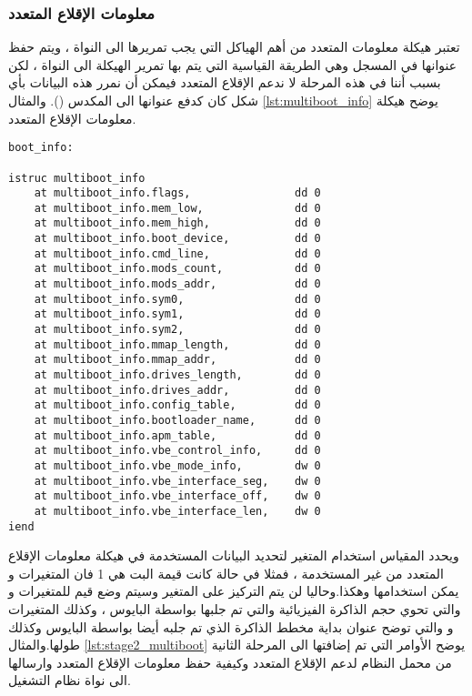 \documentclass[document.tex]{subfiles}
\begin{document}
\subsubsection{معلومات الإقلاع المتعدد} 
تعتبر هيكلة معلومات المتعدد من أهم الهياكل التي يجب تمريرها الى النواة ، ويتم حفظ عنوانها في المسجل  وهي الطريقة القياسية التي يتم بها تمرير الهيكلة الى النواة ، لكن بسبب أننا في هذه المرحلة لا ندعم الإقلاع المتعدد فيمكن أن نمرر هذه البيانات بأي شكل كان كدفع عنوانها الى المكدس (). والمثال \ref{lst:multiboot_info} يوضح هيكلة معلومات الإقلاع المتعدد.
\begin{english}
\lstset{numberstyle=\tiny,numbers=left,stepnumber=1,numbersep=5pt,tabsize=2,extendedchars=true,breaklines=true,frame=b,showspaces=false, showtabs=false,xleftmargin=10pt,framexleftmargin=10pt,framexrightmargin=5pt,framexbottommargin=4pt,showstringspaces=false,language=[x86masm]Assembler}

\begin{lstlisting}[label=lst:multiboot_info,caption=\en{Multiboot Inforamtion Structure}]
boot_info:

istruc multiboot_info
	at multiboot_info.flags,				dd 0
	at multiboot_info.mem_low,				dd 0
	at multiboot_info.mem_high,				dd 0
	at multiboot_info.boot_device,			dd 0
	at multiboot_info.cmd_line,				dd 0
	at multiboot_info.mods_count,			dd 0
	at multiboot_info.mods_addr,			dd 0
	at multiboot_info.sym0,					dd 0
	at multiboot_info.sym1,					dd 0
	at multiboot_info.sym2,					dd 0
	at multiboot_info.mmap_length,			dd 0
	at multiboot_info.mmap_addr,			dd 0
	at multiboot_info.drives_length,		dd 0
	at multiboot_info.drives_addr,			dd 0
	at multiboot_info.config_table,			dd 0
	at multiboot_info.bootloader_name,		dd 0
	at multiboot_info.apm_table,			dd 0
	at multiboot_info.vbe_control_info,		dd 0
	at multiboot_info.vbe_mode_info,		dw 0
	at multiboot_info.vbe_interface_seg,	dw 0
	at multiboot_info.vbe_interface_off,	dw 0
	at multiboot_info.vbe_interface_len,	dw 0
iend
\end{lstlisting}
\end{english}

ويحدد المقياس استخدام المتغير  لتحديد البيانات المستخدمة في هيكلة معلومات الإقلاع المتعدد من غير المستخدمة ، فمثلا في حالة كانت قيمة البت  هي 1 فان المتغيرات  و  يمكن استخدامها وهكذا.وحاليا لن يتم التركيز على المتغير   وسيتم وضع قيم للمتغيرات  و  والتي تحوي حجم الذاكرة الفيزيائية والتي تم جلبها بواسطة البايوس ، وكذلك المتغيرات  و  والتي توضح عنوان بداية مخطط الذاكرة الذي تم جلبه أيضا بواسطة البايوس وكذلك طولها.والمثال \ref{lst:stage2_multiboot} يوضح الأوامر التي تم إضافتها الى المرحلة الثانية من محمل النظام لدعم الإقلاع المتعدد وكيفية حفظ معلومات الإقلاع المتعدد وارسالها الى نواة نظام التشغيل.
\end{document}
